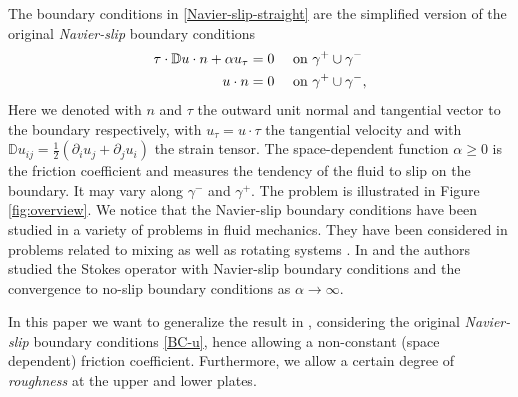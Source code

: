 \documentclass{article}
\theoremstyle{definition}
\theoremstyle{definition}
\begin{document}
The boundary conditions in \eqref{Navier-slip-straight} are the simplified version of the original \textit{Navier-slip} boundary conditions \cite{Navier1823}
\begin{equation}
    \label{BC-u}
    \begin{aligned}
        \tau \cdot \mathbb{D}u\cdot n +\alpha u_\tau &= 0 & &\textnormal{ on }\gamma^+\cup \gamma^-\\
        u\cdot n &= 0 & &\textnormal{ on }\gamma^+\cup \gamma^-, 
    \end{aligned}
\end{equation}
Here we denoted with $n$ and $\tau$ the outward unit normal and tangential vector to the boundary respectively, with $u_\tau = u\cdot \tau$ the tangential velocity and with $\mathbb{D}u_{ij} = \frac{1}{2}(\partial_i u_j +\partial_j u_i)$ the strain tensor. The space-dependent function $\alpha\geq 0$ is the friction coefficient and measures the tendency of the fluid to slip on the boundary. It may vary along $\gamma^-$ and $\gamma^+$. The problem is illustrated in Figure \ref{fig:overview}. We notice that the Navier-slip boundary conditions have been studied in a variety of problems in fluid mechanics. They have been considered in problems related to mixing \cite{huWu} as well as rotating systems \cite{dalibardVaret}.
In \cite{amroucheEscobedoGhosh} and \cite{acevdeoAmroucheConcaGhosh} the authors studied the Stokes operator with Navier-slip boundary conditions and the convergence to no-slip boundary conditions as $\alpha\to\infty$.
 
In this paper we want to generalize the result in \cite{drivasNguyenNobiliBoundsOnHeatFluxForRayleighBenardConvectionBetweenNavierSlipFixedTemperatureBoundaries}, considering the original \textit{Navier-slip} boundary conditions \eqref{BC-u}, hence allowing a non-constant (space dependent) friction coefficient. Furthermore, we allow a certain degree of \textit{roughness} at the upper and lower plates. 
\end{document}
